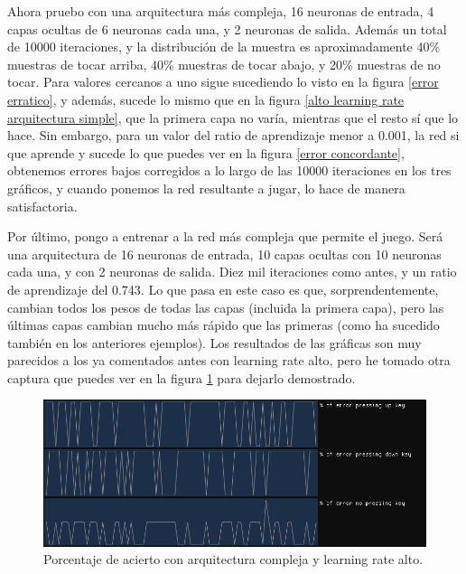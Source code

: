 Ahora pruebo con una arquitectura más compleja, 16 neuronas de entrada, 4 capas ocultas de 6 neuronas cada una, y 2 neuronas de salida. Además un total de 10000 iteraciones, y la distribución de la muestra es aproximadamente 40\% muestras de tocar arriba, 40\% muestras de tocar abajo, y 20\% muestras de no tocar. Para valores cercanos a uno sigue sucediendo lo visto en la figura \ref{error erratico}, y además, sucede lo mismo que en la figura \ref{alto learning rate arquitectura simple}, que la primera capa no varía, mientras que el resto sí que lo hace. Sin embargo, para un valor del ratio de aprendizaje menor a 0.001, la red si que aprende y sucede lo que puedes ver en la figura \ref{error concordante}, obtenemos errores bajos corregidos a lo largo de las 10000 iteraciones en los tres gráficos, y cuando ponemos la red resultante a jugar, lo hace de manera satisfactoria. 

Por último, pongo a entrenar a la red más compleja que permite el juego. Será una arquitectura de 16 neuronas de entrada, 10 capas ocultas con 10 neuronas cada una, y con 2 neuronas de salida.  Diez mil iteraciones como antes, y un ratio de aprendizaje del 0.743. Lo que pasa en este caso es que, sorprendentemente, cambian todos los pesos de todas las capas (incluida la primera capa), pero las últimas capas cambian mucho más rápido que las primeras (como ha sucedido también en los anteriores ejemplos). Los resultados de las gráficas son muy parecidos a los ya comentados antes con learning rate alto, pero he tomado otra captura que puedes ver en la figura \ref{alto learning rate arquitectura compleja} para dejarlo demostrado.

\begin{figure}[H]
	\centering
	\includegraphics[width=15cm]{archivos/imagenes/arquitectura-compleja-learning-rate-alto.png}
	\caption{Porcentaje de acierto con arquitectura compleja y learning rate alto.}
	\label{alto learning rate arquitectura compleja}
\end{figure}

